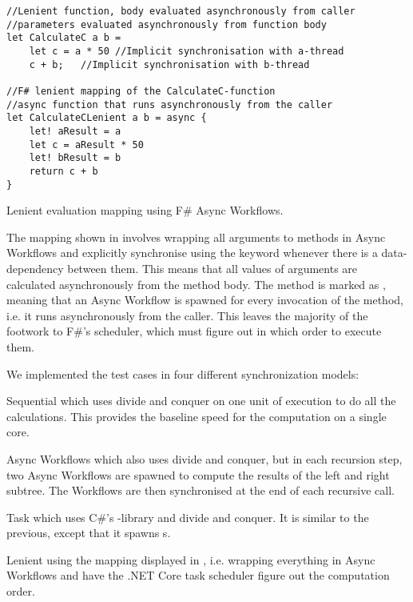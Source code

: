 \begin{listing}[H]
\begin{verbatim}
//Lenient function, body evaluated asynchronously from caller
//parameters evaluated asynchronously from function body
let CalculateC a b =
    let c = a * 50 //Implicit synchronisation with a-thread
    c + b;   //Implicit synchronisation with b-thread

//F# lenient mapping of the CalculateC-function
//async function that runs asynchronously from the caller
let CalculateCLenient a b = async {
    let! aResult = a
    let c = aResult * 50
    let! bResult = b
    return c + b
}
\end{verbatim}
\caption{Lenient evaluation mapping using F\# Async Workflows.} \label{lst:lenient:to:task}
\end{listing}
The mapping shown in  involves wrapping all arguments to methods in Async Workflows and explicitly synchronise using the  keyword whenever there is a data-dependency between them. This means that all values of arguments are calculated asynchronously from the method body. The method is marked as , meaning that an Async Workflow is spawned for every invocation of the method, i.e. it runs asynchronously from the caller. This leaves the majority of the footwork to F\#'s scheduler, which must figure out in which order to execute them.

We implemented the test cases in four different synchronization models:
\begin{labeling}{\quad\quad}
    \item[Sequential] which uses divide and conquer on one unit of execution to do all the calculations. This provides the baseline speed for the computation on a single core.
    \item[Async Workflows] which also uses divide and conquer, but in each recursion step, two Async Workflows are spawned to compute the results of the left and right subtree. The Workflows are then synchronised at the end of each recursive call.%
    \item[Task] which uses C\#'s -library and divide and conquer. It is similar to the previous, except that it spawns s.
    \item[Lenient] using the mapping displayed in , i.e. wrapping everything in Async Workflows and have the .NET Core task scheduler figure out the computation order.
\end{labeling}


